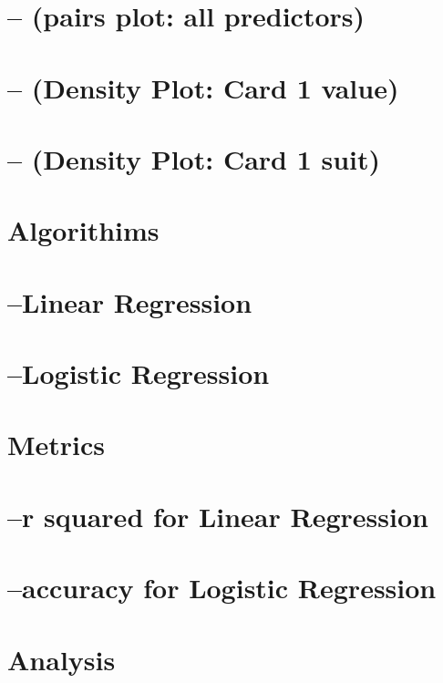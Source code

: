 \documentclass[]{article}
\begin{document}
\section{-- (pairs plot: all
predictors)}\label{pairs-plot-all-predictors}

\section{-- (Density Plot: Card 1
value)}\label{density-plot-card-1-value}

\section{-- (Density Plot: Card 1 suit)}\label{density-plot-card-1-suit}

\section{Algorithims}\label{algorithims-1}

\section{--Linear Regression}\label{linear-regression-1}

\section{--Logistic Regression}\label{logistic-regression}

\section{Metrics}\label{metrics-1}

\section{--r squared for Linear
Regression}\label{r-squared-for-linear-regression-1}

\section{--accuracy for Logistic
Regression}\label{accuracy-for-logistic-regression}

\section{Analysis}\label{analysis-1}
\end{document}
